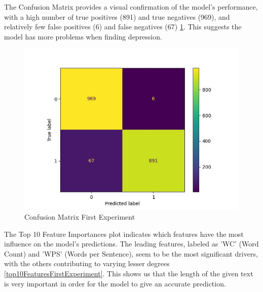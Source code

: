 The Confusion Matrix provides a visual confirmation of the model's performance, with a high number of true positives (891) and true negatives (969), and relatively few false positives (6) and false negatives (67) \ref{confusionMatrixFirstExperiment}. This suggests the model has more problems when finding depression.

\begin{figure}[htbp]
	\centering
		\includegraphics[scale=0.8]{LaTeX Bachelor Thesis Depression Signs Detection/figures/metrics/experiment1English/confusionMatrix.jpg}
	\caption{Confusion Matrix First Experiment}
	\label{confusionMatrixFirstExperiment}
\end{figure}



The Top 10 Feature Importances plot indicates which features have the most influence on the model's predictions. The leading features, labeled as 'WC' (Word Count) and 'WPS' (Words per Sentence), seem to be the most significant drivers, with the others contributing to varying lesser degrees \ref{top10FeaturesFirstExperiment}. This shows us that the length of the given text is very important in order for the model to give an accurate prediction.

